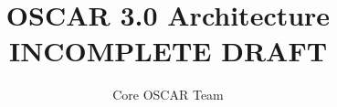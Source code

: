 %
%
%

\title{OSCAR 3.0 Architecture \\
INCOMPLETE DRAFT}
\author{Core OSCAR Team}
\maketitle
\newpage
